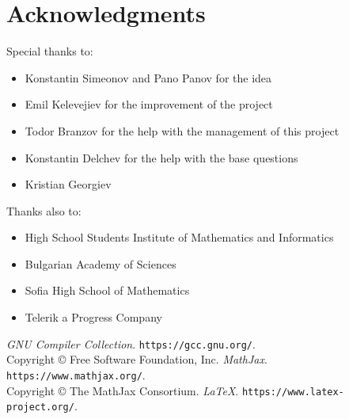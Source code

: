 \documentclass[12pt]{article}
\begin{document}
		\section{Acknowledgments}
		Special thanks to:
		\begin{itemize}
			\item Konstantin Simeonov and Pano Panov for the idea
			\item Emil Kelevejiev for the improvement of the project
			\item Todor Branzov for the help with the management of this project
			\item Konstantin Delchev for the help with the base questions
			\item Kristian Georgiev
		\end{itemize}
		Thanks also to:
		\begin{itemize}
			\item High School Students Institute of Mathematics and Informatics
			\item Bulgarian Academy of Sciences
			\item Sofia High School of Mathematics
			\item Telerik a Progress Company
		\end{itemize}
		\begin{thebibliography}{99}
	
		{\itshape GNU Compiler Collection}.
		\texttt{https://gcc.gnu.org/}. \\
		Copyright \copyright{} Free Software Foundation, Inc.
		{\itshape MathJax}.
		\texttt{https://www.mathjax.org/}. \\
		Copyright \copyright{} The MathJax Consortium.
		{\itshape \LaTeX}.
		\texttt{https://www.latex-project.org/}.
		\end{thebibliography}
		
	
\end{document}
